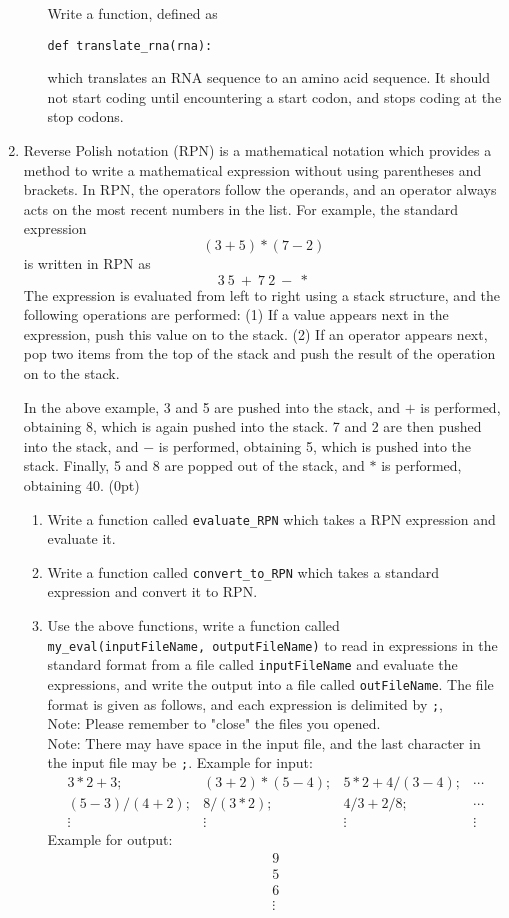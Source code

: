 \documentclass[12pt]{article}
\begin{document}
\begin{enumerate}
\begin{enumerate}
Write a function, defined as 
\begin{verbatim}
def translate_rna(rna):  
\end{verbatim} 
which translates an RNA sequence to an amino acid sequence. It should not start coding until encountering a start codon, and stops coding at the stop codons.
\end{enumerate}

\item Reverse Polish notation (RPN) is a mathematical notation which provides a method to write a mathematical expression without using parentheses and brackets. In RPN, the operators follow the operands, and  an operator always acts on the most recent numbers in the list. For example, the standard  expression
\[
(3 + 5) * (7 - 2)
\]
is written in  RPN as 
\[
3\  5\  +\  7\  2\  -\  *
\]
The expression is evaluated from left to right using a stack structure, and the following operations are performed: (1) If a value appears next in the expression, push this value on to the stack. (2) If an operator appears next, pop two items from the top of the stack and push the result of the operation on to the stack.

In the above example, 3 and 5 are pushed into the stack, and  $+$  is performed, obtaining 8, which is again pushed into the stack. 7 and 2 are then pushed into the stack, and  $-$ is performed, obtaining 5, which is pushed into the stack. Finally, 5 and 8 are popped out of the stack, and $*$ is performed, obtaining 40. (0pt)

\begin{enumerate}
\item Write a function called {\small \verb!evaluate_RPN!} which takes a RPN expression and evaluate it.
\item Write a function called {\small \verb!convert_to_RPN!} which takes a standard expression and convert it to RPN.
\item Use the above functions, write a function called\\ {\small \verb!my_eval(inputFileName, outputFileName)!} to read in expressions in the standard format from a file called \verb!inputFileName! and evaluate the expressions, and write the output into a file called \verb!outFileName!. The file format is given as follows, and each expression is delimited by {\tt ;},\\
Note: Please remember to "close" the files you opened.\\
Note: There may have space in the input file, and the last character in the input file may be {\tt ;}.
Example for input:
\[
\begin{array}{llll}
3*2+3; & (3+2)*(5-4); &  5*2+4/(3-4); &\cdots\\
(5-3)/(4+2); & 8/(3*2); & 4/3+2/8; &\cdots \\
\vdots& \vdots & \vdots & \vdots 
\end{array}
\]
Example for output:
\[
\begin{array}{llll}
9\\
5\\
6\\
\vdots
\end{array}
\]


\end{enumerate}
\end{enumerate}
\end{document}
